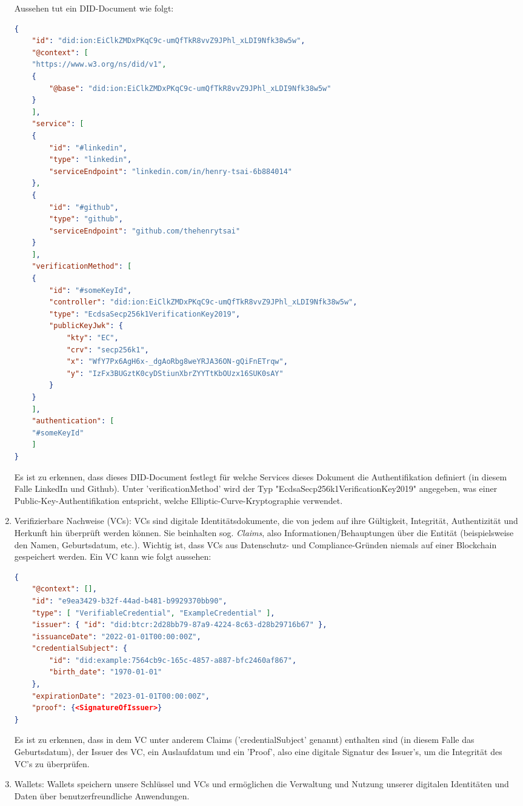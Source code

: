 \begin{enumerate}
	Aussehen tut ein DID-Document wie folgt:
	\begin{lstlisting}[language=json,firstnumber=1]	
{
	"id": "did:ion:EiClkZMDxPKqC9c-umQfTkR8vvZ9JPhl_xLDI9Nfk38w5w",
	"@context": [
	"https://www.w3.org/ns/did/v1",
	{
		"@base": "did:ion:EiClkZMDxPKqC9c-umQfTkR8vvZ9JPhl_xLDI9Nfk38w5w"
	}
	],
	"service": [
	{
		"id": "#linkedin",
		"type": "linkedin",
		"serviceEndpoint": "linkedin.com/in/henry-tsai-6b884014"
	},
	{
		"id": "#github",
		"type": "github",
		"serviceEndpoint": "github.com/thehenrytsai"
	}
	],
	"verificationMethod": [
	{
		"id": "#someKeyId",
		"controller": "did:ion:EiClkZMDxPKqC9c-umQfTkR8vvZ9JPhl_xLDI9Nfk38w5w",
		"type": "EcdsaSecp256k1VerificationKey2019",
		"publicKeyJwk": {
			"kty": "EC",
			"crv": "secp256k1",
			"x": "WfY7Px6AgH6x-_dgAoRbg8weYRJA36ON-gQiFnETrqw",
			"y": "IzFx3BUGztK0cyDStiunXbrZYYTtKbOUzx16SUK0sAY"
		}
	}
	],
	"authentication": [
	"#someKeyId"
	]
}
	\end{lstlisting}
	
	Es ist zu erkennen, dass dieses DID-Document festlegt für welche Services dieses Dokument die Authentifikation definiert (in diesem Falle LinkedIn und Github). Unter 'verificationMethod' wird der Typ "EcdsaSecp256k1VerificationKey2019" angegeben, was einer Public-Key-Authentifikation entspricht, welche Elliptic-Curve-Kryptographie verwendet.
	
	\item Verifizierbare Nachweise (VCs): VCs sind digitale Identitätsdokumente, die von jedem auf ihre Gültigkeit, Integrität, Authentizität und Herkunft hin überprüft werden können. Sie beinhalten sog. \textsl{Claims}, also Informationen/Behauptungen über die Entität (beispielsweise den Namen, Geburtsdatum, etc.). Wichtig ist, dass VCs aus Datenschutz- und Compliance-Gründen niemals auf einer Blockchain gespeichert werden. Ein VC kann wie folgt aussehen:
	
	\begin{lstlisting}[language=json,firstnumber=1]
{
	"@context": [],
	"id": "e9ea3429-b32f-44ad-b481-b9929370bb90",
	"type": [ "VerifiableCredential", "ExampleCredential" ],
	"issuer": { "id": "did:btcr:2d28bb79-87a9-4224-8c63-d28b29716b67" },
	"issuanceDate": "2022-01-01T00:00:00Z",
	"credentialSubject": {
		"id": "did:example:7564cb9c-165c-4857-a887-bfc2460af867",
		"birth_date": "1970-01-01"
	},
	"expirationDate": "2023-01-01T00:00:00Z",
	"proof": {<SignatureOfIssuer>}
}
	\end{lstlisting}
	
	Es ist zu erkennen, dass in dem VC unter anderem Claims ('credentialSubject' genannt) enthalten sind (in diesem Falle das Geburtsdatum), der Issuer des VC, ein Auslaufdatum und ein 'Proof', also eine digitale Signatur des Issuer's, um die Integrität des VC's zu überprüfen.
	
	\item Wallets: Wallets speichern unsere Schlüssel und VCs und ermöglichen die Verwaltung und Nutzung unserer digitalen Identitäten und Daten über benutzerfreundliche Anwendungen.
\end{enumerate}

